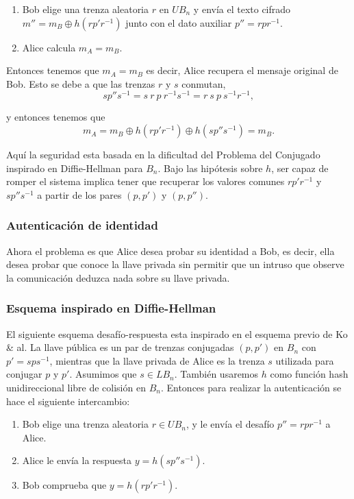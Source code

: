 \documentclass[12pt]{article}
\theoremstyle{definition}
\begin{document}
\begin{enumerate}
\item Bob elige una trenza aleatoria $r$ en $UB_n$ y envía el texto cifrado $m''=m_B\oplus h(rp'r^{-1})$ junto con el dato auxiliar $p''=rpr^{-1}$.
\item Alice calcula $m_A = m_B$. 

\end{enumerate}

Entonces tenemos que $m_A = m_B$ es decir, Alice recupera el mensaje original de Bob. Esto se debe a que las trenzas $r$ y $s$ conmutan,
$$sp''s^{-1}=s\ r\ p\ r^{-1}s^{-1}=r\ s\ p\ s^{-1}r^{-1},$$

y entonces tenemos que 
$$m_A = m_B\oplus h(rp'r^{-1})\oplus h(sp''s^{-1})=m_B.$$

Aquí la seguridad esta basada en la dificultad del Problema del Conjugado inspirado en Diffie-Hellman para $B_n$. Bajo las hipótesis sobre $h$, ser capaz de romper el sistema implica tener que recuperar los valores comunes $rp'r^{-1}$ y $sp''s^{-1}$ a partir de los pares $(p,p')$ y $(p,p'')$.

\subsubsection{Autenticación de identidad}
Ahora el problema es que Alice desea probar su identidad a Bob, es decir, ella desea probar que conoce la llave privada sin permitir que un intruso que observe la comunicación deduzca nada sobre su llave privada.

\subsubsection*{Esquema inspirado en Diffie-Hellman}

El siguiente esquema desafío-respuesta esta inspirado en el esquema previo de Ko \& al. La llave pública es un par de trenzas conjugadas $(p,p')$ en $B_n$ con $p'=sps^{-1}$, mientras que la llave privada de Alice es la trenza $s$ utilizada para conjugar $p$ y $p'$. Asumimos que $s\in LB_n$. También usaremos $h$ como función hash unidireccional libre de colisión en $B_n$. Entonces para realizar la autenticación se hace el siguiente intercambio:

\begin{enumerate}
\item Bob elige una trenza aleatoria $r\in UB_n$, y le envía el desafío $p''=rpr^{-1}$ a Alice.
\item Alice le envía la respuesta $y = h(sp''s^{-1})$.
\item Bob comprueba que $y=h(rp'r^{-1})$.
\end{enumerate}
\end{document}
